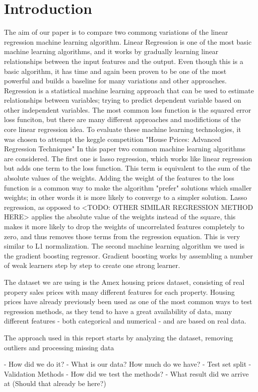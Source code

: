 \section{Introduction}
The aim of our paper is to compare two commong variations of the linear regression machine learning algorithm. Linear Regression is one of the most basic machine learning algorithms, and it works by gradually learning linear relationships between the input features and the output. Even though this is a basic algorithm, it has time and again been proven to be one of the most powerful and builds a baseline for many variations and other approaches.
Regression is a statistical machine learning approach that can be used to estimate relationships between variables; trying to predict dependent variable based on other independent variables. The most common loss function is the squared error loss funciton, but there are many different approaches and modifictions of the core linear regression idea.\newline
To evaluate these machine learning technologies, it was chosen to attempt the keggle competition "House Prices: Advanced Regression Techniques"\cite{kaggle}
In this paper two common machine learning algorithms are considered.\newline
The first one is lasso regression, which works like linear regression but adds one term to the loss function. This term is equivalent to the sum of the absolute values of the weights. Adding the weight of the features to the loss function is a common way to make the algorithm "prefer" solutions which smaller weights; in other words it is more likely to converge to a simpler solution. Lasso regression, as opposed to <TODO: OTHER SIMILAR REGRESSION METHOD HERE> applies the absolute value of the weights instead of the square, this makes it more likely to drop the weights of uncorrelated features completely to zero, and thus removes those terms from the regression equation. This is very similar to L1 normalization.\newline
The second machine learning algorithm we used is the gradient boosting regressor. Gradient boosting works by assembling a number of weak learners step by step to create one strong learner.\newline

The dataset we are using is the Amex housing prices dataset, consisting of real propery sales prices with many different features for each property. Housing prices have already previously been used as one of the most common ways to test regression methods, as they tend to have a great availability of data, many different features - both categorical and numerical - and are based on real data.\newline

The approach used in this report starts by analyzing the dataset, removing outliers and processing missing data

- How did we do it?
- What is our data? How much do we have?
- Test set split
- Validation Methods
- How did we test the methods?
- What result did we arrive at (Should that already be here?)
